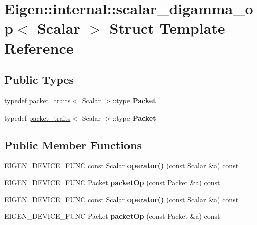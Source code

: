 \hypertarget{struct_eigen_1_1internal_1_1scalar__digamma__op}{}\section{Eigen\+:\+:internal\+:\+:scalar\+\_\+digamma\+\_\+op$<$ Scalar $>$ Struct Template Reference}
\label{struct_eigen_1_1internal_1_1scalar__digamma__op}
\subsection*{Public Types}
\begin{DoxyCompactItemize}
\item 
\mbox{\label{struct_eigen_1_1internal_1_1scalar__digamma__op_a2415e744e85551f84886cf41d9473087}} 
typedef \hyperlink{struct_eigen_1_1internal_1_1packet__traits}{packet\+\_\+traits}$<$ Scalar $>$\+::type {\bfseries Packet}
\item 
\mbox{\label{struct_eigen_1_1internal_1_1scalar__digamma__op_a2415e744e85551f84886cf41d9473087}} 
typedef \hyperlink{struct_eigen_1_1internal_1_1packet__traits}{packet\+\_\+traits}$<$ Scalar $>$\+::type {\bfseries Packet}
\end{DoxyCompactItemize}
\subsection*{Public Member Functions}
\begin{DoxyCompactItemize}
\item 
\mbox{\label{struct_eigen_1_1internal_1_1scalar__digamma__op_a5a7d450920be9d2a746db566150b0f3b}} 
E\+I\+G\+E\+N\+\_\+\+D\+E\+V\+I\+C\+E\+\_\+\+F\+U\+NC const Scalar {\bfseries operator()} (const Scalar \&a) const
\item 
\mbox{\label{struct_eigen_1_1internal_1_1scalar__digamma__op_acecc63ca3b1418d5440f8c27071f801d}} 
E\+I\+G\+E\+N\+\_\+\+D\+E\+V\+I\+C\+E\+\_\+\+F\+U\+NC Packet {\bfseries packet\+Op} (const Packet \&a) const
\item 
\mbox{\label{struct_eigen_1_1internal_1_1scalar__digamma__op_a5a7d450920be9d2a746db566150b0f3b}} 
E\+I\+G\+E\+N\+\_\+\+D\+E\+V\+I\+C\+E\+\_\+\+F\+U\+NC const Scalar {\bfseries operator()} (const Scalar \&a) const
\item 
\mbox{\label{struct_eigen_1_1internal_1_1scalar__digamma__op_acecc63ca3b1418d5440f8c27071f801d}} 
E\+I\+G\+E\+N\+\_\+\+D\+E\+V\+I\+C\+E\+\_\+\+F\+U\+NC Packet {\bfseries packet\+Op} (const Packet \&a) const
\end{DoxyCompactItemize}


